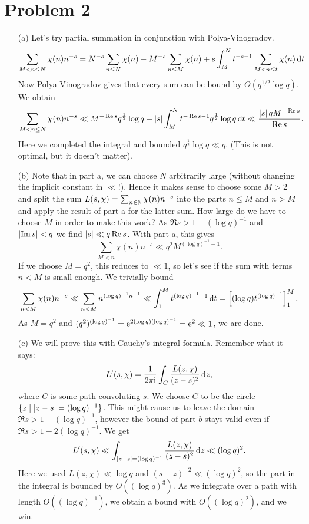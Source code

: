 \documentclass[a4paper,11pt]{article}
\begin{document}
\section*{Problem 2}
\begin{enumerate}
    \item[(a)] Let's try partial summation in conjunction with Polya-Vinogradov.
        \[
            \sum_{M < n \leq N} \chi(n) n^{-s} = 
            N^{-s} \sum_{n \leq N} \chi(n) - M^{-s} \sum_{n \leq M} \chi(n)
            + s\int_M^N t^{-s-1} \sum_{M < n \leq t} \chi(n) \mathrm{\,d} t
        \]
        Now Polya-Vinogradov gives that every sum can be bound by $O(q^{1/2}
        \log q)$. We obtain
        \[
            \sum_{M < n \leq N} \chi(n) n^{-s} 
            \ll M^{-\operatorname{Re} s} q^{\frac 12} \log q + \left\lvert s \right\rvert \int_M^N t^{-\operatorname{Re} s-1} 
            q^{\frac 12} \log q \mathrm{\,d} t  \ll \frac{\left\lvert s \right\rvert qM^{-\operatorname{Re} s}}{\operatorname{Re} s}.
        \]
        Here we completed the integral and bounded $q^{\frac 12}\log q \ll q$. 
        (This is not optimal, but it doesn't matter). 
    \item[(b)] Note that in part a, we can choose $N$ arbitrarily large (without
        changing the implicit constant in $\ll$!). Hence it 
        makes sense to choose some $M > 2$ and split the sum $L(s, \chi) =
        \sum_{n \in \mathbb{N}} \chi(n)n^{-s}$ into the parts $n \leq M$ and $n > M$
        and apply the result of part a for the latter sum. How large do we have 
        to choose $M$ in order to make this work? As $\Re s > 1 - (\log q)^{-1}$
        and $\left\lvert \operatorname{Im} s \right\rvert < q$ we find $\left\lvert s \right\rvert \ll q \operatorname{Re} s$. With part a, this 
        gives
        \[
            \sum_{M < n} \chi(n) n^{-s} \ll q^2 M^{(\log q)^{-1}-1}.
        \]
        If we choose $M = q^2$, this reduces to $\ll 1$, so let's see if the sum
        with terms $n < M$ is small enough. We trivially bound
        \[
            \sum_{n < M} \chi(n)n^{-s} \ll \sum_{n < M} n^{(\log q)^{-1}n^{-1}}
            \ll \int_1^M t^{(\log q)^{-1}-1} \mathrm{\,d} t = \left[ (\log q) t^{(\log
            q)^{-1}} \right]_1^M.
        \]
        As $M = q^2$ and $(q^2)^{(\log q)^{-1}} = \mathrm e^{2 (\log q) (\log
        q)^{-1}} = \mathrm e^2 \ll 1$, we are done.

    \item[(c)] We will prove this with Cauchy's integral formula. Remember what 
        it says:
        \[
            L'(s,\chi) = \frac{1}{2 \pi \mathrm i} \int_C \frac{L(z, \chi)}{(z-s)^2} \mathrm{\,d} z,
        \]
        where $C$ is some path convoluting $s$. We choose $C$ to be the circle
        $\{z \mid \left\lvert z-s \right\rvert = (\log q)^{-1}\}$. This might cause us to leave the
        domain $\Re s > 1 - (\log q)^{-1}$, however the bound of part $b$ stays
        valid even if $\Re s > 1 - 2(\log q)^{-1}$. We get
        \[
            L'(s, \chi) \ll \int_{\left\lvert z-s \right\rvert = (\log q)^{-1}} 
            \frac{L(z,\chi)}{(z-s)^2} \mathrm{\,d} z \ll (\log q)^2.
        \]
        Here we used $L(z,\chi) \ll \log q$ and $(s-z)^{-2} \ll (\log q)^2$, 
        so the part in the integral is bounded by $O((\log q)^3)$. As we integrate
        over a path with length $O((\log q)^{-1})$, we obtain 
        a bound with $O((\log q)^2)$, and we win.
\end{enumerate}
\end{document}

